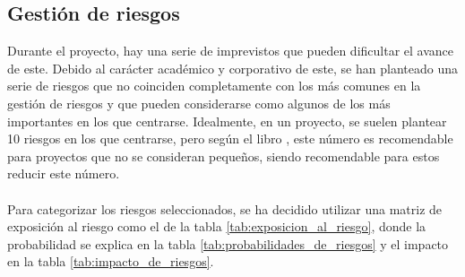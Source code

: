 \documentclass{subfiles}
\begin{document}
        \subsection{Gestión de riesgos}
        \label{sec:gestion_de_riesgos}
        Durante el proyecto, hay una serie de imprevistos que pueden dificultar el avance de este. Debido al carácter académico y corporativo de este, se han planteado una serie de riesgos que no coinciden completamente con los más comunes en la gestión de riesgos y que pueden considerarse como algunos de los más importantes en los que centrarse. Idealmente, en un proyecto, se suelen plantear 10 riesgos en los que centrarse, pero según el libro  \cite{book:hughes_bob_softwareprojectManagement}, este número es recomendable para proyectos que no se consideran pequeños, siendo recomendable para estos reducir este número.

        \paragraph{}
        Para categorizar los riesgos seleccionados, se ha decidido utilizar una matriz de exposición al riesgo como el de la tabla \ref{tab:exposicion_al_riesgo}, donde la probabilidad se explica en la tabla \ref{tab:probabilidades_de_riesgos} y el impacto en la tabla \ref{tab:impacto_de_riesgos}.
\end{document}
